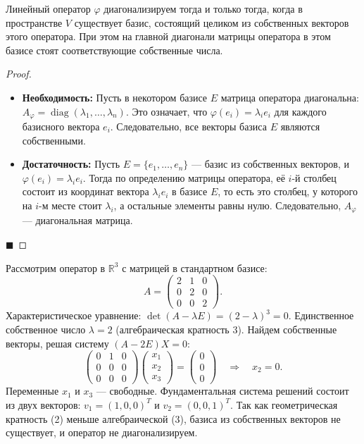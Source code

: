 \begin{theorem}
Линейный оператор $\varphi$ диагонализируем тогда и только тогда, когда в пространстве $V$ существует базис, состоящий целиком из собственных векторов этого оператора. При этом на главной диагонали матрицы оператора в этом базисе стоят соответствующие собственные числа.
\end{theorem}

\begin{proof}
\begin{itemize}
    \item \textbf{Необходимость:} Пусть в некотором базисе $E$ матрица оператора диагональна: $A_\varphi = \operatorname{diag}(\lambda_1, \dots, \lambda_n)$. Это означает, что $\varphi(e_i) = \lambda_i e_i$ для каждого базисного вектора $e_i$. Следовательно, все векторы базиса $E$ являются собственными.
    \item \textbf{Достаточность:} Пусть $E = \{e_1, \dots, e_n\}$ --- базис из собственных векторов, и $\varphi(e_i) = \lambda_i e_i$. Тогда по определению матрицы оператора, её $i$-й столбец состоит из координат вектора $\lambda_i e_i$ в базисе $E$, то есть это столбец, у которого на $i$-м месте стоит $\lambda_i$, а остальные элементы равны нулю. Следовательно, $A_\varphi$ --- диагональная матрица.
\end{itemize}
\hfill$\blacksquare$
\end{proof}

\begin{example}
Рассмотрим оператор в $\mathbb{R}^3$ с матрицей в стандартном базисе:
\[
A = \begin{pmatrix}
2 & 1 & 0 \\
0 & 2 & 0 \\
0 & 0 & 2
\end{pmatrix}.
\]
Характеристическое уравнение: $\det(A - \lambda E) = (2-\lambda)^3 = 0$. Единственное собственное число $\lambda = 2$ (алгебраическая кратность 3).
Найдем собственные векторы, решая систему $(A - 2E)X = 0$:
\[
\begin{pmatrix}
0 & 1 & 0 \\
0 & 0 & 0 \\
0 & 0 & 0
\end{pmatrix}
\begin{pmatrix} x_1 \\ x_2 \\ x_3 \end{pmatrix} = \begin{pmatrix} 0 \\ 0 \\ 0 \end{pmatrix} \quad \Rightarrow \quad x_2 = 0.
\]
Переменные $x_1$ и $x_3$ --- свободные. Фундаментальная система решений состоит из двух векторов: $v_1 = (1, 0, 0)^T$ и $v_2 = (0, 0, 1)^T$. 
Так как геометрическая кратность (2) меньше алгебраической (3), базиса из собственных векторов не существует, и оператор не диагонализируем.
\end{example}
